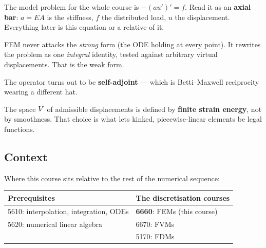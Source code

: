 
\begin{roadmap}[Lecture 1]
\begin{roadlist}
\item The model problem for the whole course is $-(au')'=f$. Read it as an
  \textbf{axial bar}: $a=EA$ is the stiffness, $f$ the distributed load, $u$ the
  displacement. Everything later is this equation or a relative of it.
\item FEM never attacks the \emph{strong} form (the ODE holding at every point).
  It rewrites the problem as one \emph{integral} identity, tested against
  arbitrary virtual displacements. That is the weak form.
\item The operator turns out to be \textbf{self-adjoint} --- which is
  Betti--Maxwell reciprocity wearing a different hat.
\item The space $V$ of admissible displacements is defined by
  \textbf{finite strain energy}, not by smoothness. That choice is what lets
  kinked, piecewise-linear elements be legal functions.
\end{roadlist}
\end{roadmap}

\subsection*{Context}

Where this course sits relative to the rest of the numerical sequence:

\begin{center}
\begin{tabular}{@{}ll@{}}
\toprule
\textbf{Prerequisites} & \textbf{The discretisation courses}\\
\midrule
5610: interpolation, integration, ODEs & \textbf{6660}: FEMs \quad(this course)\\
5620: numerical linear algebra          & 6670: FVMs\\
                                        & 5170: FDMs\\
\bottomrule
\end{tabular}
\end{center}

